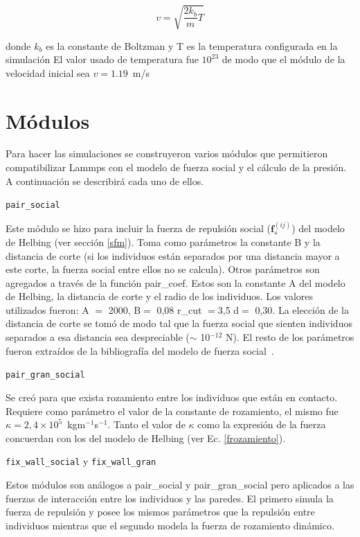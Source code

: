 \begin{equation}
v=\sqrt{\frac{2k_b}{m}T}
\end{equation}

donde $k_b$ es la constante de Boltzman y T es la temperatura configurada en la simulación
El valor usado de temperatura fue $10^{23}$ de modo que el módulo de la velocidad inicial sea $v=1.19$~m/s


\section{\label{modulos}Módulos}

Para hacer las simulaciones se construyeron varios módulos que permitieron compatibilizar Lammps con el modelo de fuerza social y el cálculo de la presión. A continuación se describirá cada uno de ellos. 

{\Large {\tt pair\_social}}

Este módulo se hizo para incluir la fuerza de repulsión social ($\mathbf{f}_s^{(ij)}$) del modelo de Helbing (ver sección \ref{sfm}). Toma como parámetros la constante B y la distancia de corte (si los individuos están separados por una distancia mayor a este corte, la fuerza social entre ellos no se calcula).
Otros parámetros son agregados a través de la función pair\_coef. Estos son la constante A del modelo de Helbing, la distancia 
de corte y el radio de los individuos. Los valores utilizados fueron: A $=$ 2000, B$=$ 0,08 r\_cut $=$3,5 d$=$ 0,30.
La elección de la distancia de corte se tomó de modo tal que la fuerza social que sienten individuos separados a esa distancia
sea despreciable ($\sim$ 10$^{-12}$ N). El resto de los parámetros fueron extraídos de la bibliografía del modelo de fuerza social~\cite{Helbing1}.

{\Large {\tt pair\_gran\_social}}

Se creó para que exista rozamiento entre los individuos que están en contacto. Requiere como parámetro el valor de la constante de rozamiento, el mismo fue $\kappa =2,4 \times 10^5$~kgm$^{-1}$s$^{-1}$. Tanto el valor de $\kappa$ como la expresión de la fuerza concuerdan con los del modelo de Helbing (ver Ec. \ref{frozamiento}).

{\Large {\tt fix\_wall\_social} y {\tt fix\_wall\_gran}}

Estos módulos son análogos a pair\_social y pair\_gran\_social pero aplicados a las fuerzas de interacción entre los individuos y las paredes. El primero simula la fuerza de repulsión y posee los mismos parámetros que la repulsión entre individuos mientras que el segundo modela la fuerza de rozamiento dinámico. 

